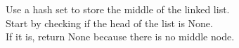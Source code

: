 \documentclass[preview]{standalone}
\begin{document}
Use a hash set to store the middle of the linked list.\\Start by checking if the head of the list is None.\\If it is, return None because there is no middle node.\\
\end{document}
